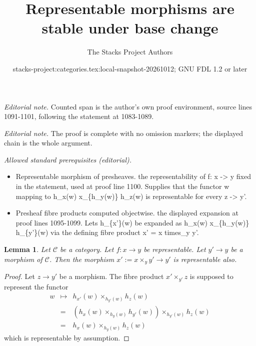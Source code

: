 \documentclass{stacks-project}
\title{Representable morphisms are stable under base change}
\author{The Stacks Project Authors}
\date{stacks-project:categories.tex:local-snapshot-20261012; GNU FDL 1.2 or later}
\theoremstyle{plain}
\newtheorem{lemma}[subsection]{Lemma}
\theoremstyle{definition}
\theoremstyle{remark}
\numberwithin{equation}{subsection}
\begin{document}
\maketitle
\noindent\textit{Editorial note.} Counted span is the author's own proof environment, source lines 1091-1101, following the statement at 1083-1089.\par\medskip
\noindent\textit{Editorial note.} The proof is complete with no omission markers; the displayed chain is the whole argument.\par\medskip
\noindent\textit{Allowed standard prerequisites (editorial).}\begin{itemize}
\item Representable morphism of presheaves. the representability of f: x -> y fixed in the statement, used at proof line 1100. Supplies that the functor w mapping to h\_x(w) x\_\{h\_y(w)\} h\_z(w) is representable for every z -> y'.
\item Presheaf fibre products computed objectwise. the displayed expansion at proof lines 1095-1099. Lets h\_\{x'\}(w) be expanded as h\_x(w) x\_\{h\_y(w)\} h\_\{y'\}(w) via the defining fibre product x' = x times\_y y'.
\end{itemize}\medskip
\begin{lemma}
\label{lemma-base-change-representable}
Let $\mathcal{C}$ be a category.
Let $f : x \to y$ be representable.
Let $y' \to y$ be a morphism of $\mathcal{C}$.
Then the morphism $x' := x \times_y y' \to y'$ is representable also.
\end{lemma}

\begin{proof}
Let $z \to y'$ be a morphism. The fibre product
$x' \times_{y'} z$ is supposed to represent the
functor
\begin{eqnarray*}
w & \mapsto & h_{x'}(w)\times_{h_{y'}(w)} h_z(w) \\
& = & (h_x(w) \times_{h_y(w)} h_{y'}(w)) \times_{h_{y'}(w)} h_z(w) \\
& = & h_x(w) \times_{h_y(w)} h_z(w)
\end{eqnarray*}
which is representable by assumption.
\end{proof}
\end{document}
